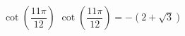 {$\cot \left( \dfrac{11\pi}{12} \right)$}
{$\cot \left( \dfrac{11\pi}{12} \right) = -(2 + \sqrt{3})$}
